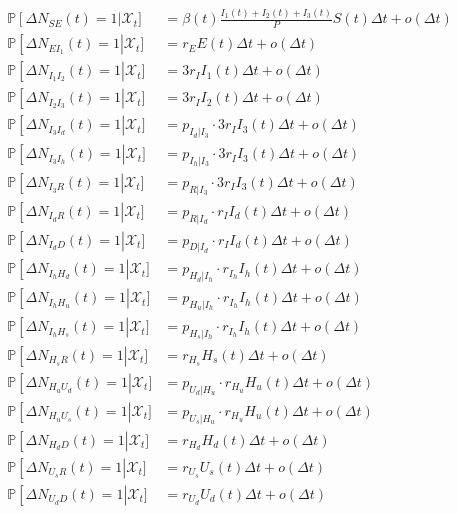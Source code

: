 \begin{gather}
\label{eq:stochsys}
\begin{aligned}
    \mathbb{P}\left[ \Delta N_{SE}(t) = 1 \right|\mathcal{X}_t] &=  \beta(t)  \frac{I_1(t) + I_2(t) + I_3(t)}{P} S(t) \Delta t + o(\Delta t)\\
    \mathbb{P}\left[ \Delta N_{EI_1}(t) = 1 \right|\mathcal{X}_t] &= r_{E} E(t) \Delta t + o(\Delta t) \\
    \mathbb{P}\left[ \Delta N_{I_1 I_2}(t) = 1 \right|\mathcal{X}_t] &= 3r_{I} I_1(t) \Delta t + o(\Delta t)\\
    \mathbb{P}\left[ \Delta N_{I_2 I_3}(t) = 1 \right|\mathcal{X}_t] &= 3r_{I} I_2(t) \Delta t + o(\Delta t)\\
    \mathbb{P}\left[ \Delta N_{I_3 I_d}(t) = 1 \right|\mathcal{X}_t] &= p_{I_d|I_3} \cdot 3r_{I}  I_3(t) \Delta t + o(\Delta t)\\
    \mathbb{P}\left[ \Delta N_{I_3 I_h}(t) = 1 \right|\mathcal{X}_t] &= p_{I_h|I_3} \cdot 3r_{I}   I_3(t) \Delta t + o(\Delta t)\\
    \mathbb{P}\left[ \Delta N_{I_3 R}(t) = 1 \right|\mathcal{X}_t] &= p_{R|I_3} \cdot 3r_{I}  I_3(t) \Delta t + o(\Delta t)\\
    \mathbb{P}\left[ \Delta N_{I_d R}(t) = 1 \right|\mathcal{X}_t] &= p_{R|I_d} \cdot r_{I}  I_d(t) \Delta t + o(\Delta t)\\
    \mathbb{P}\left[ \Delta N_{I_d D}(t) = 1 \right|\mathcal{X}_t] &= p_{D|I_d}\cdot r_{I} I_d(t) \Delta t + o(\Delta t)\\
    \mathbb{P}\left[ \Delta N_{I_h H_d}(t) = 1 \right|\mathcal{X}_t] &= p_{H_d|I_h} \cdot r_{I_h}  I_h(t) \Delta t + o(\Delta t)\\
    \mathbb{P}\left[ \Delta N_{I_h H_u}(t) = 1 \right|\mathcal{X}_t] &= p_{H_u|I_h} \cdot r_{I_h} I_h(t) \Delta t + o(\Delta t)\\
    \mathbb{P}\left[ \Delta N_{I_h H_s}(t) = 1 \right|\mathcal{X}_t] &= p_{H_s|I_h} \cdot r_{I_h} I_h(t) \Delta t + o(\Delta t)\\
   \mathbb{P}\left[ \Delta N_{H_s R}(t) = 1 \right|\mathcal{X}_t] &=  r_{H_s} H_s(t) \Delta t + o(\Delta t)\\
    \mathbb{P}\left[ \Delta N_{H_u U_d}(t) = 1 \right|\mathcal{X}_t] &=   p_{U_d|H_u} \cdot r_{H_u} H_u(t) \Delta t + o(\Delta t)\\
    \mathbb{P}\left[ \Delta N_{H_u U_s}(t) = 1 \right|\mathcal{X}_t] &=   p_{U_s|H_u} \cdot r_{H_u} H_u(t) \Delta t + o(\Delta t)\\
    \mathbb{P}\left[ \Delta N_{H_d D}(t) = 1 \right|\mathcal{X}_t] &=   r_{H_d} H_d(t) \Delta t + o(\Delta t)\\
    \mathbb{P}\left[ \Delta N_{U_s R}(t) = 1 \right|\mathcal{X}_t] &=   r_{U_s} U_s(t) \Delta t + o(\Delta t)\\
    \mathbb{P}\left[ \Delta N_{U_d D}(t) = 1 \right|\mathcal{X}_t] &=   r_{U_d} U_d(t) \Delta t + o(\Delta t)\\
\end{aligned}
\end{gather}

